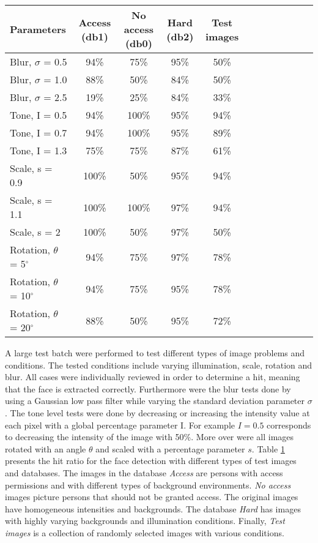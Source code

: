 \begin{table}[H]
\small
  \label{tb:result}
\begin{tabular}{l*{10}{c}r}
\hline
Parameters & Access (db1) & No access (db0) & Hard (db2) & Test images \\
\hline
Blur, $\sigma$ = 0.5  & 94\% 	& 75\% 		& 95\% 		& 50\%  \\ \hline
Blur, $\sigma$ = 1.0  & 88\% 		& 50\% 		& 84\% 	& 50\% \\ \hline
Blur, $\sigma$ = 2.5  & 19\% 	& 25\% 		& 84\% 		& 33\% \\ \hline
Tone, I = 0.5  		& 94\% 	& 100\%	 		& 95\%		& 94\% \\ \hline
Tone, I = 0.7  		& 94\%		& 100\%   	    & 95\% 	& 89\% 	\\ \hline
Tone, I = 1.3  		& 75\%		& 75\%		& 87\% 	& 61\% 	 \\ \hline
Scale, s = 0.9 		& 100\% 		& 50\% 		& 95\% 	& 94\% 	 \\ \hline
Scale, s = 1.1  		& 100\% 		& 100\% 		& 97\% 	& 94\%		  \\ \hline
Scale, s = 2  			& 100\% 		& 50\%		& 97\% 	& 50\%		  \\ \hline
Rotation, $\theta$ = 5$^{\circ}$  	& 94\% 	& 75\%		& 97\% 		& 78\% 	 \\ \hline
Rotation, $\theta$ = 10$^{\circ}$   & 94\% 	& 75\%		& 95\% 		& 78\% 	 \\ \hline
Rotation, $\theta$ = 20$^{\circ}$  & 88\% 		& 50\%		& 95\% 	& 72\% 	 \\ \hline
\end{tabular}
\end{table}

A large test batch were performed to test different types of image problems and conditions. The tested conditions include varying illumination, scale, rotation and blur. All cases were individually reviewed in order to determine a hit, meaning that the face is extracted correctly. Furthermore were the blur tests done by using a Gaussian low pass filter while varying the standard deviation parameter $\sigma$.
The tone level tests were done by decreasing or increasing the intensity value at each pixel with a global percentage parameter I. For example $I = 0.5$ corresponds to decreasing the intensity of the image with 50\%.
More over were all images rotated with an angle $\theta$ and scaled with a percentage parameter $s$.
\newline
\indent Table \ref{tb:result} presents the hit ratio for the face detection with different types of test images and databases.
The images in the database \textit{Access} are persons with access permissions and with different types of background environments.
\textit{No access} images picture persons that should not be granted access. The original images have homogeneous intensities and backgrounds.
The database \textit{Hard} has images with highly varying backgrounds and illumination conditions. Finally, \textit{Test images} is a collection of randomly selected images with various conditions.
